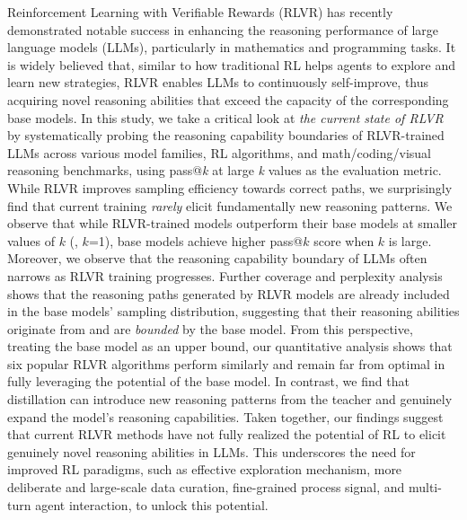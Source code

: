 Reinforcement Learning with Verifiable Rewards (RLVR) has recently demonstrated notable success in enhancing the reasoning performance of large language models (LLMs), particularly in mathematics and programming tasks. 
It is widely believed that, similar to how traditional RL helps agents to explore and learn new strategies, RLVR enables LLMs to continuously self-improve, thus acquiring novel reasoning abilities that exceed the capacity of the corresponding base models. 
In this study, we take a critical look at \textit{the current state of RLVR} by systematically probing the reasoning capability boundaries of RLVR-trained LLMs across various model families, RL algorithms, and math/coding/visual reasoning benchmarks, using pass@\textit{k} at large \textit{k} values as the evaluation metric.
While RLVR improves sampling efficiency towards correct paths, we surprisingly find that current training \emph{rarely} elicit fundamentally new reasoning patterns.
We observe that while RLVR-trained models outperform their base models at smaller values of $k$ (\eg, $k$=1), base models achieve higher pass@$k$ score when $k$ is large.
Moreover, we observe that the reasoning capability boundary of LLMs often narrows as RLVR training progresses.
Further coverage and perplexity analysis shows that the reasoning paths generated by RLVR models are already included in the base models' sampling distribution, suggesting that their reasoning abilities originate from and are \textit{bounded} by the base model. 
From this perspective, treating the base model as an upper bound, our quantitative analysis shows that six popular RLVR algorithms perform similarly and remain far from optimal in fully leveraging the potential of the base model.
In contrast, we find that distillation can introduce new reasoning patterns from the teacher and genuinely expand the model's reasoning capabilities.
Taken together, our findings suggest that current RLVR methods have not fully realized the potential of RL to elicit genuinely novel reasoning abilities in LLMs. This underscores the need for improved RL paradigms, such as effective exploration mechanism, more deliberate and large-scale data curation, fine-grained process signal, and multi-turn agent interaction, to unlock this potential.

